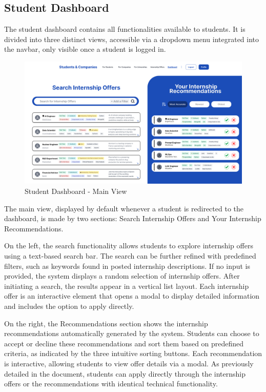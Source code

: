 \subsection{Student Dashboard}
\label{subsec: student_dashboard}

The student dashboard contains all functionalities available to students. It is divided into three distinct views, accessible via a dropdown menu integrated into the navbar, only visible once a student is logged in.

\begin{figure} [H]
    \begin{center}
        \includegraphics[width=0.9\linewidth]{LaTeXCode/images/UI/Student Dashboard - Main View.png}
        \caption{Student Dashboard - Main View}
        \label{fig: dashboard_student_main}
    \end{center}
\end{figure}

The main view, displayed by default whenever a student is redirected to the dashboard, is made by two sections: Search Internship Offers and Your Internship Recommendations.

On the left, the search functionality allows students to explore internship offers using a text-based search bar. The search can be further refined with predefined filters, such as keywords found in posted internship descriptions. If no input is provided, the system displays a random selection of internship offers. After initiating a search, the results appear in a vertical list layout. Each internship offer is an interactive element that opens a modal to display detailed information and includes the option to apply directly.

On the right, the Recommendations section shows the internship recommendations automatically generated by the system. Students can choose to accept or decline these recommendations and sort them based on predefined criteria, as indicated by the three intuitive sorting buttons. Each recommendation is interactive, allowing students to view offer details via a modal. 
As previously detailed in the document, students can apply directly through the internship offers or the recommendations with identical technical functionality.

